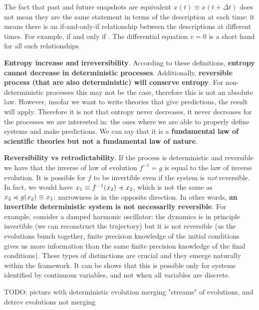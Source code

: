 \documentclass[10pt, onecolumn, longbibliography, nofootinbib]{revtex4-2}
\begin{document}
The fact that past and future snapshots are equivalent $x(t) \equiv x(t + \Delta t)$ does not mean they are the same statement in terms of the description at each time: it means there is an if-and-only-if relationship between the descriptions at different times. For example,  if and only if . The differential equation $\dot{v} = 0$ is a short hand for all such relationships.

\textbf{Entropy increase and irreversibility}. According to these definitions, \textbf{entropy cannot decrease in deterministic processes}. Additionally, \textbf{reversible process (that are also deterministic) will conserve entropy}. For non-deterministic processes this may not be the case, therefore this is not an absolute law. However, insofar we want to write theories that give predictions, the result will apply. Therefore it is not that entropy never decreases, it never decreases for the processes we are interested in: the ones where we are able to properly define systems and make predictions. We can say that it is a \textbf{fundamental law of scientific theories but not a fundamental law of nature}.

\textbf{Reversibility vs retrodictability}. If the process is deterministic and reversible we have that the inverse of law of evolution $f^{-1}=g$ is equal to the law of inverse evolution. It is possible for $f$ to be invertible even if the system is \emph{not} reversible. In fact, we would have $x_1 \equiv f^{-1}(x_2) \preccurlyeq x_2$, which is not the same as $x_2 \preccurlyeq g(x_2) \equiv x_1$: narrowness is in the opposite direction. In other words, \textbf{an invertible deterministic system is not necessarily reversible}. For example, consider a damped harmonic oscillator: the dynamics is in principle invertible (we can reconstruct the trajectory) but it is not reversible (as the evolutions bunch together, finite precision knowledge of the initial conditions gives us more information than the same finite precision knowledge of the final conditions). These types of distinctions are crucial and they emerge naturally within the framework. It can be shows that this is possible only for systems identified by continuous variables, and not when all variables are discrete.

TODO: picture with deterministic evolution merging "streams" of evolutions, and detrev evolutions not merging
\end{document}
